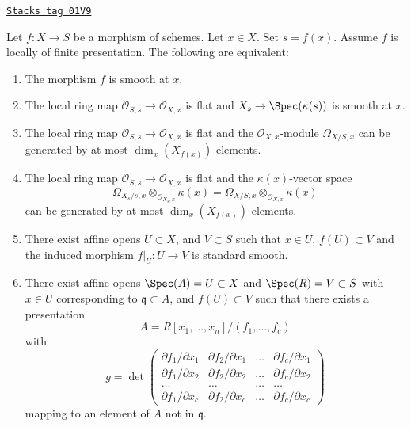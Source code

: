 \begin{lemma}
\label{morphisms-lemma-smooth-at-point}
\href{https://stacks.math.columbia.edu/tag/01V9}{\texttt{Stacks tag 01V9}}

Let $f : X \to S$ be a morphism of schemes.
Let $x \in X$.
Set $s = f(x)$.
Assume $f$ is locally of finite presentation.
The following are equivalent:
\begin{enumerate}
\item The morphism $f$ is smooth at $x$.
\item The local ring map $\mathcal{O}_{S, s} \to \mathcal{O}_{X, x}$
is flat and $X_s \to \Spec(\kappa(s))$ is smooth at $x$.
\item The local ring map $\mathcal{O}_{S, s} \to \mathcal{O}_{X, x}$
is flat and the $\mathcal{O}_{X, x}$-module $\Omega_{X/S, x}$
can be generated by at most $\dim_x(X_{f(x)})$ elements.
\item The local ring map $\mathcal{O}_{S, s} \to \mathcal{O}_{X, x}$
is flat and the $\kappa(x)$-vector space
$$
\Omega_{X_s/s, x} \otimes_{\mathcal{O}_{X_s, x}} \kappa(x) =
\Omega_{X/S, x} \otimes_{\mathcal{O}_{X, x}} \kappa(x)
$$
can be generated by at most $\dim_x(X_{f(x)})$ elements.
\item There exist affine opens $U \subset X$,
and $V \subset S$ such that $x \in U$, $f(U) \subset V$ and the
induced morphism $f|_U : U \to V$ is standard smooth.
\item There exist affine opens $\Spec(A) = U \subset X$
and $\Spec(R) = V \subset S$ with $x \in U$ corresponding
to $\mathfrak q \subset A$, and $f(U) \subset V$
such that there exists a presentation
$$
A = R[x_1, \ldots, x_n]/(f_1, \ldots, f_c)
$$
with
$$
g =
\det
\left(
\begin{matrix}
\partial f_1/\partial x_1 &
\partial f_2/\partial x_1 &
\ldots &
\partial f_c/\partial x_1 \\
\partial f_1/\partial x_2 &
\partial f_2/\partial x_2 &
\ldots &
\partial f_c/\partial x_2 \\
\ldots & \ldots & \ldots & \ldots \\
\partial f_1/\partial x_c &
\partial f_2/\partial x_c &
\ldots &
\partial f_c/\partial x_c
\end{matrix}
\right)
$$
mapping to an element of $A$ not in $\mathfrak q$.
\end{enumerate}
\end{lemma}

